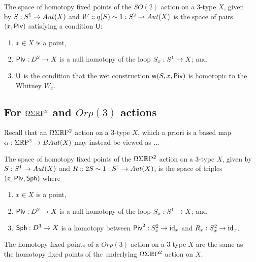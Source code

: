 \documentclass{amsart}
\begin{document}
\begin{proposition}
The space of homotopy fixed points of the $SO(2)$ action on a 3-type $X$, given by $S: S^1 \rightarrow Aut(X)$ and $W :: q(S) \sim 1 : S^2 \to Aut(X)$ is the space of pairs $(x,\mathsf{Piv})$ satisfying a condition $\mathsf{U}$:
\begin{enumerate}
\item $x \in X$ is a point,
\item $\mathsf{Piv}: D^2 \rightarrow X$ is a null homotopy of the loop $S_x: S^1 \rightarrow X$; and
\item $\mathsf{U}$ is the condition that the wet construction $\mathsf{w}(S,x,\mathsf{Piv})$ is homotopic to the Whitney $W_x$.
\end{enumerate}
\end{proposition}

\subsection{For $\Omega \Sigma \mathbb R \mathrm{P}^2$ and $Orp(3)$ actions}

Recall that an $\Omega \Sigma \mathbb R \mathrm{P}^2$ action on a 3-type $X$, which a priori is a based map $\alpha: \Sigma \mathbb R \mathrm{P}^2 \rightarrow BAut(X)$ may instead be viewed as ... 


\begin{proposition}
The space of homotopy fixed points of the $\Omega \Sigma \mathbb R \mathrm{P}^2$ action on a 3-type $X$, given by $S: S^1 \rightarrow Aut(X)$ and $R:: 2S \sim 1 : S^1 \rightarrow Aut(X)$, is the space of triples $(x, \mathsf{Piv}, \mathsf{Sph})$ where
\begin{enumerate}
\item $x \in X$ is a point,
\item $\mathsf{Piv}: D^2 \rightarrow X$ is a null homotopy of the loop $S_x: S^1 \rightarrow X$; and
\item $\mathsf{Sph}: D^3 \rightarrow X$ is a homotopy between $\mathsf{Piv}^2 : S_x^2 \rightarrow \mathrm{id}_x$ and $R_x: S_x^2 \rightarrow \mathrm{id}_x$.
\end{enumerate}
\end{proposition}


\begin{proposition} 
\label{prop-quadvs2fp}
The homotopy fixed points of a $Orp(3)$ action on a 3-type $X$ are the same as the homotopy fixed points of the underlying $\Omega \Sigma \mathbb R \mathrm{P}^2$ action on $X$.
\end{proposition}
\end{document}
